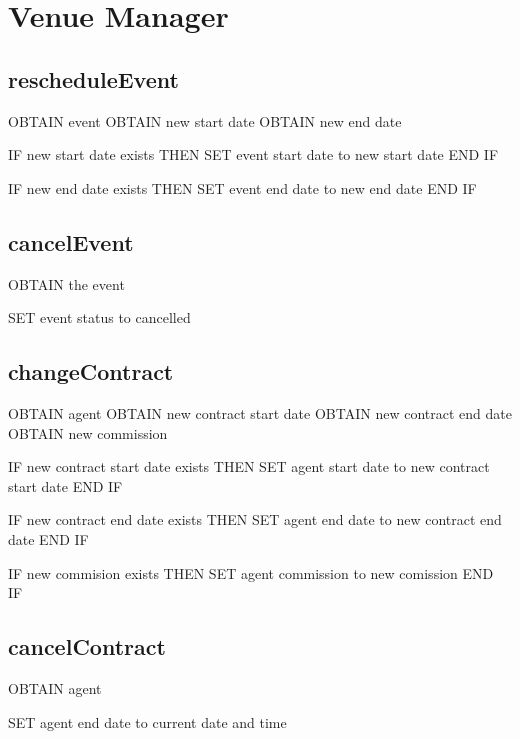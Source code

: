 \section{Venue Manager}

\subsection{rescheduleEvent}
\begin{pc}
OBTAIN event
OBTAIN new start date
OBTAIN new end date

IF new start date exists THEN
    SET event start date to new start date
END IF

IF new end date exists THEN
    SET event end date to new end date
END IF
\end{pc}

\subsection{cancelEvent}
\begin{pc}
OBTAIN the event

SET event status to cancelled
\end{pc}

\subsection{changeContract}
\begin{pc}
OBTAIN agent
OBTAIN new contract start date
OBTAIN new contract end date
OBTAIN new commission

IF new contract start date exists THEN
    SET agent start date to new contract start date
END IF

IF new contract end date exists THEN
    SET agent end date to new contract end date
END IF

IF new commision exists THEN
    SET agent commission to new comission
END IF
\end{pc}

\subsection{cancelContract}
\begin{pc}
OBTAIN agent

SET agent end date to current date and time
\end{pc}
